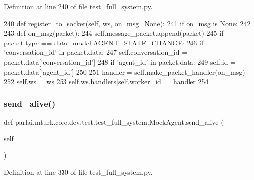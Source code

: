 Definition at line 240 of file test\+\_\+full\+\_\+system.\+py.


\begin{DoxyCode}
240     \textcolor{keyword}{def }register\_to\_socket(self, ws, on\_msg=None):
241         \textcolor{keywordflow}{if} on\_msg \textcolor{keywordflow}{is} \textcolor{keywordtype}{None}:
242 
243             \textcolor{keyword}{def }on\_msg(packet):
244                 self.message\_packet.append(packet)
245                 \textcolor{keywordflow}{if} packet.type == data\_model.AGENT\_STATE\_CHANGE:
246                     \textcolor{keywordflow}{if} \textcolor{stringliteral}{'conversation\_id'} \textcolor{keywordflow}{in} packet.data:
247                         self.conversation\_id = packet.data[\textcolor{stringliteral}{'conversation\_id'}]
248                     \textcolor{keywordflow}{if} \textcolor{stringliteral}{'agent\_id'} \textcolor{keywordflow}{in} packet.data:
249                         self.id = packet.data[\textcolor{stringliteral}{'agent\_id'}]
250 
251         handler = self.make\_packet\_handler(on\_msg)
252         self.ws = ws
253         self.ws.handlers[self.worker\_id] = handler
254 
\end{DoxyCode}
\mbox{\label{classparlai_1_1mturk_1_1core_1_1dev_1_1test_1_1test__full__system_1_1MockAgent_a2a8aaa90f95349b4de8517bfd6d010d6}} 
\subsubsection{\texorpdfstring{send\+\_\+alive()}{send\_alive()}}
{\footnotesize\ttfamily def parlai.\+mturk.\+core.\+dev.\+test.\+test\+\_\+full\+\_\+system.\+Mock\+Agent.\+send\+\_\+alive (\begin{DoxyParamCaption}\item[{}]{self }\end{DoxyParamCaption})}



Definition at line 330 of file test\+\_\+full\+\_\+system.\+py.



